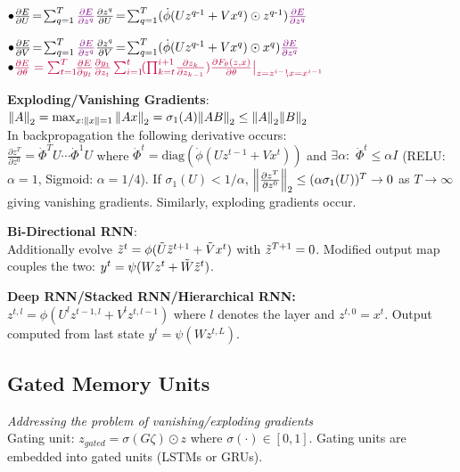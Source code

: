 $\bullet \frac{\partial E}{\partial U} \!=\! \sum_{q=1}^T {\color{violet}\frac{\partial E}{\partial z^q}} \frac{\partial z^q}{\partial U} \!=\! \sum_{q=1}^T (\dot\phi(Uz^{q\text{-}1}+Vx^{q}) \odot z^{q\text{-}1}) {\color{violet}\frac{\partial E}{\partial z^q}}$

$\bullet \frac{\partial E}{\partial V} \!=\! \sum_{q=1}^T {\color{violet}\frac{\partial E}{\partial z^q}} \frac{\partial z^q}{\partial V} \!=\! \sum_{q=1}^T (\dot\phi(Uz^{q\text{-}1}+Vx^{q}) \odot x^{q}) {\color{violet}\frac{\partial E}{\partial z^q}}$
\\

$\bullet \color{purple}\frac{\partial E}{\partial \theta} = \sum_{t=1}^T \!\!\frac{\partial E}{\partial y_t} \frac{\partial y_t}{\partial z_t} \sum_{i=1}^t\!( \prod_{k=t}^{i+1} \!\frac{\partial z_k}{\partial z_{k-1}}) \frac{\partial F_\theta(z,x)}{\partial \theta} \big\vert_{z=z^{i-1}\!\!, x = x^{i-1}}$

\textbf{Exploding/Vanishing Gradients}:\\ 
$\norm{A}_2=\max_{x:\norm{x}=1}\norm{Ax}_2=\sigma_1(A) \hfill \norm{AB}_2\leq \norm{A}_2\norm{B}_2$\\
In backpropagation the following derivative occurs:\\
$\frac{\partial z^T}{\partial z^0}=\dot{\Phi}^TU\cdots \dot{\Phi}^1U$ where $\dot{\Phi}^t=\text{diag}(\dot \phi (Uz^{t-1}+Vx^t))$ and $\exists \alpha : $ $\dot{\Phi}^t\leq\alpha I$ (RELU: $\alpha=1$, Sigmoid: $\alpha=1/4$). If $\sigma_1(U)<1/\alpha$, $\norm{\frac{\partial z^T}{\partial z^0}}_2\leq (\alpha\sigma_1(U))^T\rightarrow 0$ as $T\rightarrow \infty $ giving vanishing gradients. Similarly, exploding gradients occur.

\textbf{Bi-Directional RNN}:\\
Additionally evolve $\Tilde{z}^t=\phi(\Tilde{U}\Tilde{z}^{t+1}+\Tilde{V}x^t)$ with $\Tilde{z}^{T+1}=0$. Modified output map couples the two: $y^t=\psi(Wz^t+\Tilde{W}\Tilde{z}^t)$.

\textbf{Deep RNN/Stacked RNN/Hierarchical RNN:}\\ 
$z^{t,l}=\phi(U^lz^{t-1,l}+V^lz^{t,l-1})$ where $l$ denotes the layer and $z^{t,0}=x^t$. Output computed from last state $y^t=\psi(Wz^{t,L})$.

\subsection*{Gated Memory Units}
\textit{Addressing the problem of vanishing/exploding gradients}\\
Gating unit: $z_{gated} =\sigma(G\zeta)\odot z$ where $\sigma(\cdot) \in [0,1]$. Gating units are embedded into gated units (LSTMs or GRUs).\\

